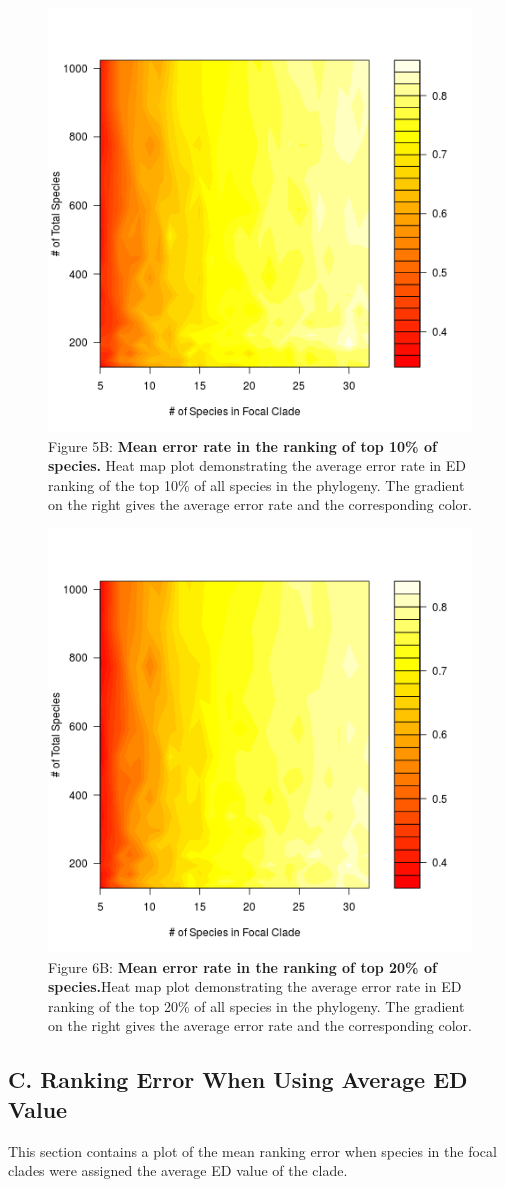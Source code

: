 \documentclass[10pt,english]{article}
\begin{document}
\begin{figure}[!ht]
  \center
  \includegraphics[width=.5\textwidth]{errorRate10pct.png}
  \caption*{Figure 5B: \textbf{Mean error rate in the ranking of top 10\% of species.} Heat
  map plot demonstrating the average error rate in ED ranking of the top 10\% of
  all species in the phylogeny. The gradient on the right gives the average
  error rate and the corresponding color.}
\end{figure}

\begin{figure}[!ht]
  \center
  \includegraphics[width=.5\textwidth]{errorRate20pct.png}
  \caption*{Figure 6B: \textbf{Mean error rate in the ranking of top 20\% of species.}Heat
  map plot demonstrating the average error rate in ED ranking of the top 20\% of
  all species in the phylogeny. The gradient on the right gives the average
  error rate and the corresponding color.}
\end{figure}
\clearpage
\subsection*{C. Ranking Error When Using Average ED Value}

This section contains a plot of the mean ranking error when species in the focal
clades were assigned the average ED value of the clade.
\end{document}
